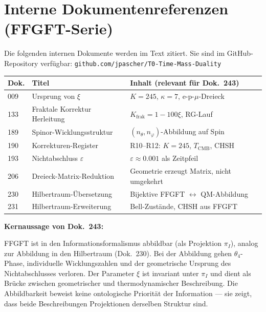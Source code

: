 \section*{Interne Dokumentenreferenzen (FFGFT-Serie)}

Die folgenden internen Dokumente werden im Text zitiert. Sie sind im
GitHub-Repository verfügbar:
\texttt{github.com/jpascher/T0-Time-Mass-Duality}

\begin{center}
\renewcommand{\arraystretch}{1.3}
{\small
\begin{tabular}{p{1.2cm}p{6cm}p{6cm}}
\toprule
\textbf{Dok.} & \textbf{Titel} & \textbf{Inhalt (relevant für Dok.~243)} \\
\midrule
009 & Ursprung von $\xi$ & $K=245$, $\kappa=7$, e-p-$\mu$-Dreieck \\
133 & Fraktale Korrektur Herleitung & $K_\text{frak} = 1 - 100\xi$, RG-Lauf \\
189 & Spinor-Wicklungsstruktur & $(n_\theta, n_\varphi)$-Abbildung auf Spin \\
190 & Korrekturen-Register & R10--R12: $K=245$, $T_\text{CMB}$, CHSH \\
193 & Nichtabschluss $\varepsilon$ & $\varepsilon \approx 0.001$ als Zeitpfeil \\
206 & Dreieck-Matrix-Reduktion & Geometrie erzeugt Matrix, nicht umgekehrt \\
230 & Hilbertraum-Übersetzung & Bijektive FFGFT $\leftrightarrow$ QM-Abbildung \\
231 & Hilbertraum-Erweiterung & Bell-Zustände, CHSH aus FFGFT \\
\bottomrule
\end{tabular}
}
\end{center}

\begin{keyresult}
  \textbf{Kernaussage von Dok.~243:}

  FFGFT ist in den Informationsformalismus abbildbar (als Projektion
  $\pi_I$), analog zur Abbildung in den Hilbertraum (Dok.~230).
  Bei der Abbildung gehen $\theta_4$-Phase, individuelle
  Wicklungszahlen und der geometrische Ursprung des Nichtabschlusses
  verloren. Der Parameter $\xi$ ist invariant unter $\pi_I$ und
  dient als Brücke zwischen geometrischer und thermodynamischer
  Beschreibung. Die Abbildbarkeit beweist keine ontologische
  Priorität der Information --- sie zeigt, dass beide Beschreibungen
  Projektionen derselben Struktur sind.
\end{keyresult}
